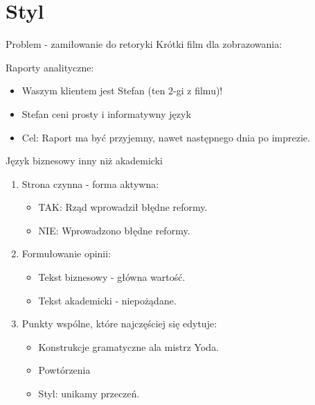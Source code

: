 \documentclass{beamer}
\begin{document}
\section{Styl}
\begin{frame}{Problem - zamiłowanie do retoryki}
	Krótki film dla zobrazowania: \href{https://www.youtube.com/watch?v=MJLCcQPgye0}{}
	
	\vspace{5mm}
	Raporty analityczne:
	\begin{itemize}	
		\item Waszym klientem jest Stefan (ten 2-gi z filmu)!
		\item Stefan ceni prosty i informatywny język
		\item Cel: Raport ma być przyjemny, nawet następnego dnia po imprezie. 
	\end{itemize}
\end{frame}

\begin{frame}{Język biznesowy inny niż akademicki}
	\begin{enumerate}
		\item Strona czynna - forma aktywna:
			\begin{itemize}
				\item TAK: Rząd wprowadził błędne reformy.
				\item NIE: Wprowadzono błędne reformy. 
			\end{itemize}
		\vspace{5mm}
		\item Formułowanie opinii:
			\begin{itemize}
				\item Tekst biznesowy - główna wartość.
				\item Tekst akademicki - niepożądane.
			\end{itemize}	
		
		\vspace{5mm}
		\item Punkty wspólne, które najczęściej się edytuje:
			\begin{itemize}
				\item Konstrukcje gramatyczne ala mistrz Yoda. 
				\item Powtórzenia
				\item Styl: unikamy przeczeń.
		\end{itemize}	
		
	\end{enumerate}	

\end{frame}
\end{document}
